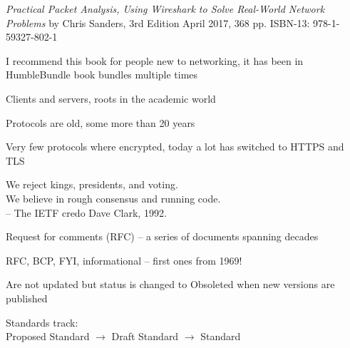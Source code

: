 \documentclass[Screen16to9,17pt]{foils}
\begin{document}
\emph{Practical Packet Analysis,
Using Wireshark to Solve Real-World Network Problems}
by Chris Sanders, 3rd Edition
April 2017, 368 pp.
ISBN-13:
978-1-59327-802-1

I recommend this book for people new to networking, it has been in HumbleBundle book bundles multiple times





\begin{list1}
\item Clients and servers, roots in the academic world
\item Protocols are old, some more than 20 years
\item Very few protocols where encrypted, today a lot has switched to HTTPS and TLS
\end{list1}


{\hlkbig \color{titlecolor}
We reject kings, presidents, and voting.\\
We believe in rough consensus and running code.\\
-- The IETF credo Dave Clark, 1992.}

\begin{list1}
\item Request for comments (RFC) -- a series of documents spanning decades
\item RFC, BCP, FYI, informational -- first ones from 1969!
\item Are not updated but status is changed to Obsoleted when new versions are published
\item Standards track:\\
Proposed Standard $\rightarrow$ Draft Standard $\rightarrow$ Standard
\end{list1}

\end{document}
